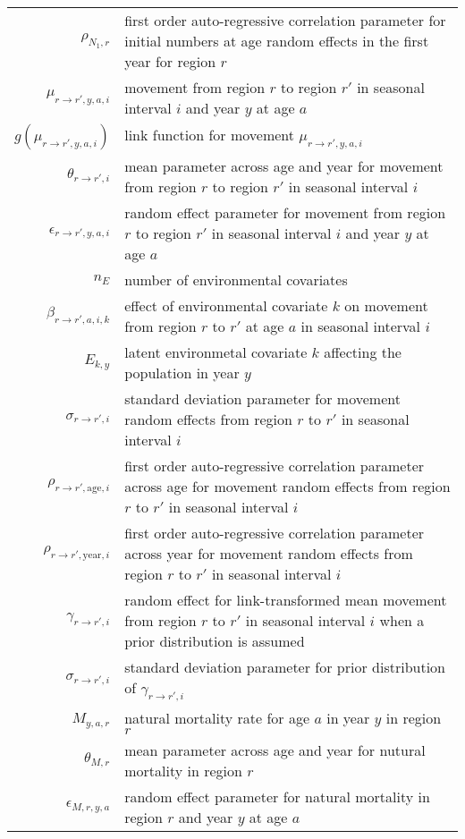\begin{longtable}[c]{r p{}}
$\rho_{N_1,r}$ & first order auto-regressive correlation parameter for initial numbers at age random effects in the first year for region $r$\\
$\mu_{r\rightarrow r',y,a,i}$ & movement from region $r$ to region $r'$ in seasonal interval $i$ and year $y$ at age $a$\\
$g(\mu_{r\rightarrow r',y,a,i})$ & link function for movement $\mu_{r\rightarrow r',y,a,i}$\\
$\theta_{r\rightarrow r',i}$ & mean parameter across age and year for movement from region $r$ to region $r'$ in seasonal interval $i$\\
$\epsilon_{r\rightarrow r',y,a,i}$ &  random effect parameter for movement from region $r$ to region $r'$ in seasonal interval $i$ and year $y$ at age $a$\\
$n_E$ & number of environmental covariates\\
$\beta_{r \rightarrow r',a,i,k}$ & effect of environmental covariate $k$ on movement from region $r$ to $r'$ at age $a$ in seasonal interval $i$\\
$E_{k,y}$ & latent environmetal covariate $k$ affecting the population in year $y$\\
$\sigma_{r \rightarrow r',i}$ & standard deviation parameter for movement random effects from region $r$ to $r'$ in seasonal interval $i$\\
$\rho_{r \rightarrow r',\text{age},i}$ & first order auto-regressive correlation parameter across age for movement random effects from region $r$ to $r'$ in seasonal interval $i$\\
$\rho_{r \rightarrow r',\text{year},i}$ & first order auto-regressive correlation parameter across year for movement random effects from region $r$ to $r'$ in seasonal interval $i$\\
$\gamma_{r\rightarrow r',i}$ & random effect for link-transformed mean movement from region $r$ to $r'$ in seasonal interval $i$ when a prior distribution is assumed\\
$\sigma_{r\rightarrow r',i}$ & standard deviation parameter for prior distribution of $\gamma_{r\rightarrow r',i}$\\
$M_{y,a,r}$ & natural mortality rate for age $a$ in year $y$ in region $r$\\
$\theta_{M,r}$ & mean parameter across age and year for nutural mortality in region $r$\\
$\epsilon_{M,r,y,a}$ & random effect parameter for natural mortality in region $r$ and year $y$ at age $a$\\

\end{longtable}
